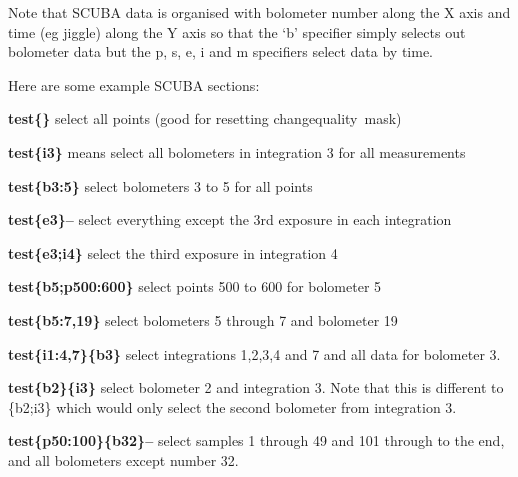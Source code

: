 \documentclass[twoside,11pt]{article}
\newcommand{\task}[1]{{\sf #1}}
\newcommand{\chgqual}{\htmlref{\task{change\_quality}}{CHANGE_QUALITY}}
\newcommand{\htmlref}[2]{#1}
\renewcommand{\_}{\texttt{\symbol{95}}}
\begin{document}
Note that SCUBA data is organised with bolometer number along the 
X axis and time (eg jiggle) along the Y axis so  that the `b' specifier
simply selects out bolometer data but the p, s, e, i and m specifiers select
data by time.

Here are some example SCUBA sections:

\begin{description} 

\item \textbf{test\{\}} \newline
          select all points (good for resetting \chgqual\
          mask)

\item \textbf{test\{i3\}} \newline
          means select all bolometers in integration 3 for all
          measurements
 
\item \textbf{test\{b3:5\}} \newline
          select bolometers 3 to 5 for all points
 
\item \textbf{test\{e3\}--} \newline
    select everything except the 3rd exposure in each integration

\item \textbf{test\{e3;i4\}}  \newline
    select the third exposure in integration 4

\item \textbf{test\{b5;p500:600\}} \newline
    select points 500 to 600 for bolometer 5

\item \textbf{test\{b5:7,19\}}   \newline
    select bolometers 5 through 7 and bolometer 19

\item \textbf{test\{i1:4,7\}\{b3\}} \newline
    select integrations 1,2,3,4 and 7 and all data for
    bolometer 3.

\item \textbf{test\{b2\}\{i3\}}\newline
    select bolometer 2 and integration 3. Note that this
    is different to \{b2;i3\} which would only select the second
    bolometer from integration 3.

\item \textbf{test\{p50:100\}\{b32\}--}\newline
    select samples 1 through 49 and 101 through to the end, and
    all bolometers except number 32.

\end{description}
\end{document}
